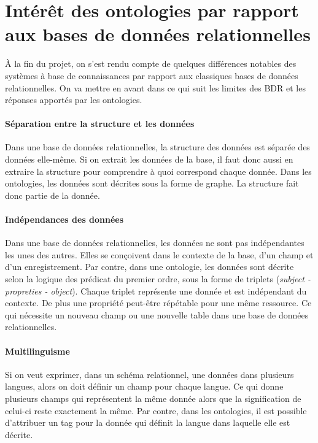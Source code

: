 \documentclass[oneside,13pt,a4paper]{article}
\begin{document}
\section{Intérêt des ontologies par rapport aux bases de données relationnelles}

À la fin du projet, on s’est rendu compte de quelques différences notables des systèmes à base de connaissances par rapport aux classiques bases de données relationnelles. On va mettre en avant dans ce qui suit les limites des BDR et les réponses apportés par les ontologies.

\paragraph{Séparation entre la structure et les données}

Dans une base de données relationnelles, la structure des données est séparée des données elle-même. Si on extrait les données de la base, il faut donc aussi en extraire la structure pour comprendre à quoi correspond chaque donnée. Dans les ontologies, les données sont décrites sous la forme de graphe. La structure fait donc partie de la donnée.

\paragraph{Indépendances des données} 

Dans une base de données relationnelles, les données ne sont pas indépendantes les unes des autres. Elles se conçoivent dans le contexte de la base, d'un champ et d'un enregistrement. Par contre, dans une ontologie, les données sont décrite selon la logique des prédicat du premier ordre, sous la forme de triplets (\textit{subject - propreties - object}). Chaque triplet représente une donnée et est indépendant du contexte. De plus une propriété peut-être répétable pour une même ressource. Ce qui nécessite un nouveau champ ou une nouvelle table dans une base de données relationnelles.

\paragraph{Multilinguisme}

Si on veut exprimer, dans un schéma relationnel, une données dans plusieurs langues, alors on doit définir un champ pour chaque langue. Ce qui donne plusieurs champs qui représentent la même donnée alors que la signification de celui-ci reste exactement la même. Par contre, dans les ontologies, il est possible d'attribuer un tag pour la donnée qui définit la langue dans laquelle elle est décrite.
\end{document}
